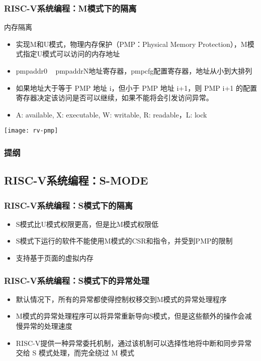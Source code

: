 \begin{frame}
    \frametitle{RISC-V系统编程：M模式下的隔离}
    内存隔离
    \begin{itemize}
        \item 实现M和U模式，物理内存保护（PMP：Physical Memory Protection），M模式指定U模式可以访问的内存地址
        \item pmpaddr0 ~ pmpaddrN地址寄存器，pmpcfg配置寄存器，地址从小到大排列
        \item 如果地址大于等于 PMP 地址 i，但小于 PMP 地址 i+1，则 PMP i+1 的配置寄存器决定该访问是否可以继续，如果不能将会引发访问异常。
        \item A: available, X: executable, W: writable, R: readable，L: lock
        
    \end{itemize}
    
    \centering
    \texttt{[image: rv-pmp]}
    
\end{frame}
\begin{frame}
    \frametitle{提纲} 
    \tableofcontents 
\end{frame}

\subsection{RISC-V系统编程：S-MODE}

\begin{frame}
    \frametitle{RISC-V系统编程：S模式下的隔离}
    \begin{itemize}
        \item S模式比U模式权限更高，但是比M模式权限低
        \item S模式下运行的软件不能使用M模式的CSR和指令，并受到PMP的限制
        \item 支持基于页面的虚拟内存
        
    \end{itemize}
    
\end{frame}


\begin{frame}
    \frametitle{RISC-V系统编程：S模式下的异常处理}
    \begin{itemize}
        \item 默认情况下，所有的异常都使得控制权移交到M模式的异常处理程序
        \item M模式的异常处理程序可以将异常重新导向S模式，但是这些额外的操作会减慢异常的处理速度
        \item RISC-V提供一种异常委托机制，通过该机制可以选择性地将中断和同步异常交给 S 模式处理，而完全绕过 M 模式
        
    \end{itemize}
   
    
\end{frame}

